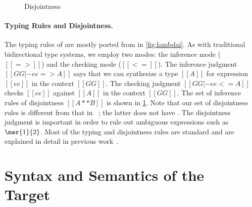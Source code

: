 \begin{figure}[t]
  \centering
  \caption{Disjointness}
  \label{fig:disjoint}
\end{figure}


\paragraph{Typing Rules and Disjointness.}

The typing rules of \namee are mostly ported from \oname in \cref{fig:lambdai}.
As with traditional bidirectional type systems, we employ two modes: the
inference mode ($[[=>]]$) and the checking mode ($[[<=]]$). The inference
judgment $[[GG |- ee => A]]$ says that we can synthesize a type $[[A]]$ for
expression $[[ee]]$ in the context $[[GG]]$. The checking judgment $[[GG |- ee <= A]]$
checks $[[ee]]$ against $[[A]]$ in the context $[[GG]]$. The set of
inference rules of disjointness $[[A ** B]]$ is shown in \cref{fig:disjoint}.
Note that our set of disjointness rules is different from that in
\oname~\citep[Figure 10]{oliveira2016disjoint}; the latter does not have
.
The disjointness judgment is
important in order to rule out ambiguous expressions such as $\mer{1}{2}$. Most
of the typing and disjointness rules are standard and are explained in detail in
previous work~\citep{oliveira2016disjoint, alpuimdisjoint}.



\section{Syntax and Semantics of the Target}
\label{sec:elaboration}

